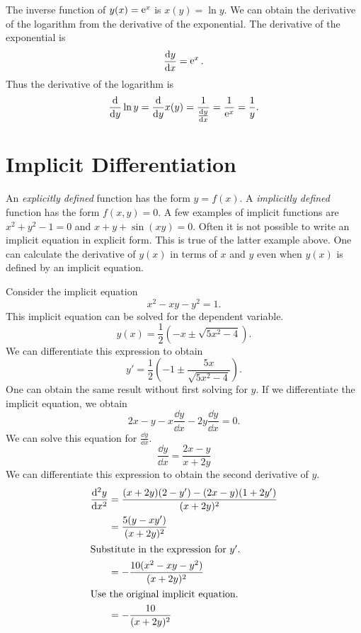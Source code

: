 \begin{Example}
  The inverse function of $y(x) = \mathop{\mathrm{e}}\nolimits^x$ is $x(y) = \ln y$.  We can obtain
  the derivative of the logarithm from the derivative of the exponential.
  The derivative of the exponential is
  \[
  \frac{\mathrm{d} y}{\mathrm{d} x} = \mathop{\mathrm{e}}\nolimits^x.
  \]
  Thus the derivative of the logarithm is
  \[
  \frac{\mathrm{d}}{\mathrm{d} y} \ln y = \frac{\mathrm{d}}{\mathrm{d} y} x(y) 
  = \frac{1}{\frac{\mathrm{d} y}{\mathrm{d} x} }
  = \frac{1}{\mathop{\mathrm{e}}\nolimits^x} = \frac{1}{y}.
  \] 
\end{Example}











\section{Implicit Differentiation}

An \textit{explicitly defined} function has the form $y = f(x)$.  A
\textit{implicitly defined} function has the form $f(x, y) = 0$.  A few 
examples of implicit functions are $x^2 + y^2 - 1 = 0$ and 
$x + y + \sin(x y) = 0$.  Often it is not possible to write an implicit
equation in explicit form.  This is true of the latter example above.
One can calculate the derivative of $y(x)$ in terms of $x$ and $y$ 
even when $y(x)$ is defined by an implicit equation.  


\begin{Example}
  Consider the implicit equation
  \[
  x^2 - x y - y^2 = 1.
  \]
  This implicit equation can be solved for the dependent variable.
  \[
  y(x) = \frac{1}{2} \left( -x \pm \sqrt{5 x^2 - 4} \right).
  \]
  We can differentiate this expression to obtain
  \[
  y' = \frac{1}{2} \left( -1 \pm \frac{5 x}{\sqrt{5 x^2 - 4}} \right).
  \]
  One can obtain the same result without first solving for $y$.  If we 
  differentiate the implicit equation, we obtain
  \[
  2 x - y - x \frac{\dd y}{\dd x} - 2 y \frac{\dd y}{\dd x} = 0.
  \]
  We can solve this equation for $\frac{\dd y}{\dd x}$.
  \[
  \frac{\dd y}{\dd x} = \frac{2x - y}{x + 2y}
  \]
  We can differentiate this expression to obtain the second derivative of $y$.
  \begin{align*}
    \frac{\mathrm{d}^2 y}{\mathrm{d} x^2}
    &= \frac{ (x+2y) (2-y') - (2x-y)(1+2y') }{ (x + 2y)^2 } \\
    &= \frac{ 5(y - x y') }{ (x + 2y)^2 } \\
    \intertext{Substitute in the expression for $y'$.}
    &= - \frac{ 10 (x^2 - x y - y^2) }{ (x + 2y)^2 } \\
    \intertext{Use the original implicit equation.}
    &= - \frac{ 10 }{ (x + 2y)^2 } 
  \end{align*}
\end{Example}









